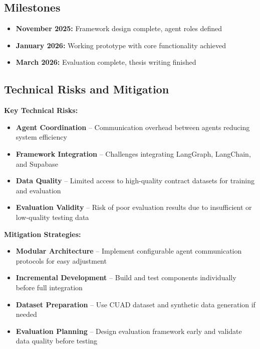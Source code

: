\subsection{Milestones}

\begin{itemize}
    \item \textbf{November 2025:} Framework design complete, agent roles defined
    \item \textbf{January 2026:} Working prototype with core functionality achieved
    \item \textbf{March 2026:} Evaluation complete, thesis writing finished
\end{itemize}

\subsection{Technical Risks and Mitigation}

\textbf{Key Technical Risks:}
\begin{itemize}
    \item \textbf{Agent Coordination} – Communication overhead between agents reducing system efficiency
    \item \textbf{Framework Integration} – Challenges integrating LangGraph, LangChain, and Supabase
    \item \textbf{Data Quality} – Limited access to high-quality contract datasets for training and evaluation
    \item \textbf{Evaluation Validity} – Risk of poor evaluation results due to insufficient or low-quality testing data
\end{itemize}

\textbf{Mitigation Strategies:}
\begin{itemize}
    \item \textbf{Modular Architecture} – Implement configurable agent communication protocols for easy adjustment
    \item \textbf{Incremental Development} – Build and test components individually before full integration
    \item \textbf{Dataset Preparation} – Use CUAD dataset and synthetic data generation if needed
    \item \textbf{Evaluation Planning} – Design evaluation framework early and validate data quality before testing
\end{itemize}
